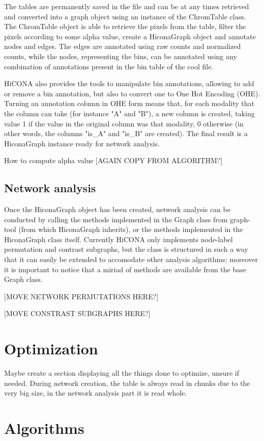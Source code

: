 The tables are permanently saved in the file and can be at any times retrieved and converted into a graph object using an instance of the ChromTable class. The ChromTable object is able to retrieve the pixels from the table, filter the pixels according to some alpha value, create a HiconaGraph object and annotate nodes and edges. The edges are annotated using raw counts and normalized counts, while the nodes, representing the bins, can be annotated using any combination of annotations present in the bin table of the cool file.

HiCONA also provides the tools to manipulate bin annotations, allowing to add or remove a bin annotation, but also to convert one to One Hot Encoding (OHE). Turning an annotation column in OHE form means that, for each modality that the column can take (for instance "A" and "B"), a new column is created, taking value 1 if the value in the original column was that modality, 0 otherwise (in other words, the columns "is\_A" and "is\_B" are created). The final result is a HiconaGraph instance ready for network analysis.

How to compute alpha value [AGAIN COPY FROM ALGORITHM?]

\subsection{Network analysis}
Once the HiconaGraph object has been created, network analysis can be conducted by calling the methods implemented in the Graph class from graph-tool (from which HiconaGraph inherits), or the methods implemented in the HiconaGraph class itself. Currently HiCONA only implements node-label permutation and contrast subgraphs, but the class is structured in such a way that it can easily be extended to accomodate other analysis algorithms; moreover it is important to notice that a miriad of methods are available from the base Graph class.

[MOVE NETWORK PERMUTATIONS HERE?]

[MOVE CONSTRAST SUBGRAPHS HERE?]

\section{Optimization}
Maybe create a section displaying all the things done to optimize, unsure if needed.
During network creation, the table is always read in chunks due to the very big size, in the network analysis part it is read whole.

\section{Algorithms}

